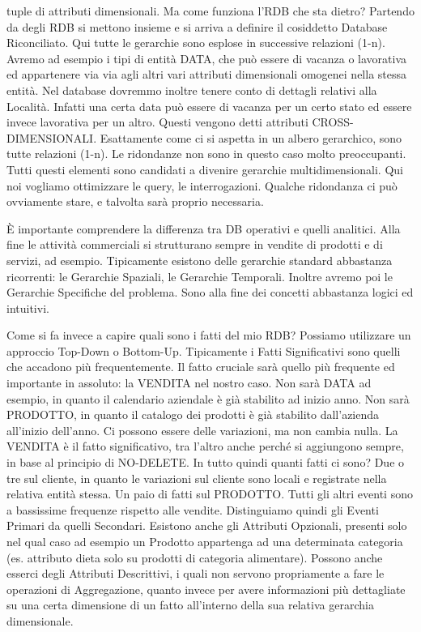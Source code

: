 tuple di attributi dimensionali. Ma come funziona l'RDB che sta dietro? Partendo da degli RDB si mettono insieme e si arriva a definire il cosiddetto Database Riconciliato. Qui tutte le gerarchie sono esplose in successive relazioni (1-n). Avremo ad esempio i tipi di entità DATA, che può essere di vacanza o lavorativa ed appartenere via via agli altri vari attributi dimensionali omogenei nella stessa entità. Nel database dovremmo inoltre tenere conto di dettagli relativi alla Località. Infatti una certa data può essere di vacanza per un certo stato ed essere invece lavorativa per un altro. Questi vengono detti attributi CROSS-DIMENSIONALI. Esattamente come ci si aspetta in un albero gerarchico, sono tutte relazioni (1-n). Le ridondanze non sono in questo caso molto preoccupanti. Tutti questi elementi sono candidati a divenire gerarchie multidimensionali. Qui noi vogliamo ottimizzare le query, le interrogazioni. Qualche ridondanza ci può ovviamente stare, e talvolta sarà proprio necessaria.  

\`E importante comprendere la differenza tra DB operativi e quelli analitici. Alla fine le attività commerciali si strutturano sempre in vendite di prodotti e di servizi, ad esempio. Tipicamente esistono delle gerarchie standard abbastanza ricorrenti: le Gerarchie Spaziali, le Gerarchie Temporali. Inoltre avremo poi le Gerarchie Specifiche del problema. Sono alla fine dei concetti abbastanza logici ed intuitivi.  

Come si fa invece a capire quali sono i fatti del mio RDB? Possiamo utilizzare un approccio Top-Down o Bottom-Up. Tipicamente i Fatti Significativi sono quelli che accadono più frequentemente. Il fatto cruciale sarà quello più frequente ed importante in assoluto: la VENDITA nel nostro caso. Non sarà DATA ad esempio, in quanto il calendario aziendale è già stabilito ad inizio anno. Non sarà PRODOTTO, in quanto il catalogo dei prodotti è già stabilito dall'azienda all'inizio dell'anno. Ci possono essere delle variazioni, ma non cambia nulla. La VENDITA è il fatto significativo, tra l'altro anche perché si aggiungono sempre, in base al principio di NO-DELETE. In tutto quindi quanti fatti ci sono? Due o tre sul cliente, in quanto le variazioni sul cliente sono locali e registrate nella relativa entità stessa. Un paio di fatti sul PRODOTTO. Tutti gli altri eventi sono a bassissime frequenze rispetto alle vendite. Distinguiamo quindi gli Eventi Primari da quelli Secondari. Esistono anche gli Attributi Opzionali, presenti solo nel qual caso ad esempio un Prodotto appartenga ad una determinata categoria (es. attributo dieta solo su prodotti di categoria alimentare). Possono anche esserci degli Attributi Descrittivi, i quali non servono propriamente a fare le operazioni di Aggregazione, quanto invece per avere informazioni più dettagliate su una certa dimensione di un fatto all'interno della sua relativa gerarchia dimensionale. 


